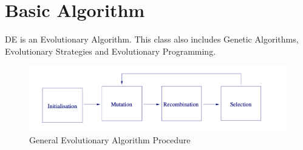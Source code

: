 \documentclass[A4, twocolumn]{article}
\begin{document}
	\section{\textbf{Basic Algorithm}}
	DE is an Evolutionary Algorithm. This class also includes Genetic Algorithms, Evolutionary Strategies and
	Evolutionary Programming. 
	
	
	\begin{figure}
		\includegraphics[width=\linewidth]{schema.png}
		\caption{General Evolutionary Algorithm Procedure}
		\label{fig:General Evolutionary Algorithm Procedure}
	\end{figure}

	
	
\end{document}
